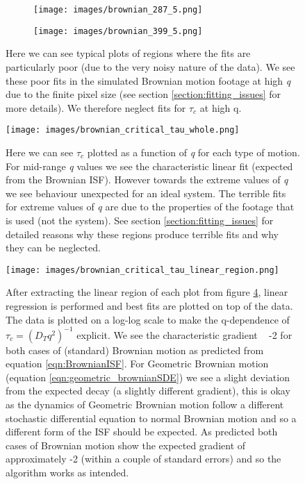 \documentclass[11pt]{article}
\begin{document}
\begin{figure}[H]
\begin{subfigure}[t]{.5\textwidth}
  \centering
  \texttt{[image: images/brownian\_287\_5.png]}
  \label{fig:simulated_brownian1_37_5}
\end{subfigure}%
\hfill
\begin{subfigure}[t]{.5\textwidth}
  \centering
  \texttt{[image: images/brownian\_399\_5.png]}
 \label{fig:simulated_brownian1_67_5}
\end{subfigure}
\caption{Here we can see typical plots of regions where the fits are particularly poor (due to the very noisy nature of the data). We see these poor fits in the simulated Brownian motion footage at high \textit{q} due to the finite pixel size (see section \ref{section:fitting_issues} for more details). We therefore neglect fits for $\tau_c$ at high q.}
\label{fig:simulated_brownian_troubled}
\end{figure}

\begin{figure}[H]
\centering
\texttt{[image: images/brownian\_critical\_tau\_whole.png]}
\caption{Here we can see $\tau_c$ plotted as a function of \textit{q} for each type of motion. For mid-range \textit{q} values we see the characteristic linear fit (expected from the Brownian ISF). However towards the extreme values of \textit{q} we see behaviour unexpected for an ideal system. The terrible fits for extreme values of \textit{q} are due to the properties of the footage that is used (not the system). See section \ref{section:fitting_issues} for detailed reasons why these regions produce terrible fits and why they can be neglected.}
\label{fig:simulated_brownian_tauc_whole}
\end{figure}

\begin{figure}[H]
  \centering
\texttt{[image: images/brownian\_critical\_tau\_linear\_region.png]}
  \caption{After extracting the linear region of each plot from figure \ref{fig:simulated_brownian_tauc_whole}, linear regression is performed and best fits are plotted on top of the data. The data is plotted on a log-log scale to make the q-dependence of $\tau_c = (D_T q^{2})^{-1}$ explicit. We see the characteristic gradient ~ -2 for both cases of (standard) Brownian motion as predicted from equation \ref{eqn:BrownianISF}. For Geometric Brownian motion (equation \ref{eqn:geometric_brownianSDE}) we see a slight deviation from the expected decay (a slightly different gradient), this is okay as the dynamics of Geometric Brownian motion follow a different stochastic differential equation to normal Brownian motion and so a different form of the ISF should be expected. As predicted both cases of Brownian motion show the expected gradient of approximately -2 (within a couple of standard errors) and so the algorithm works as intended.}
 \label{fig:simulated_brownian_tauc_linear_region}
\end{figure}
\end{document}
